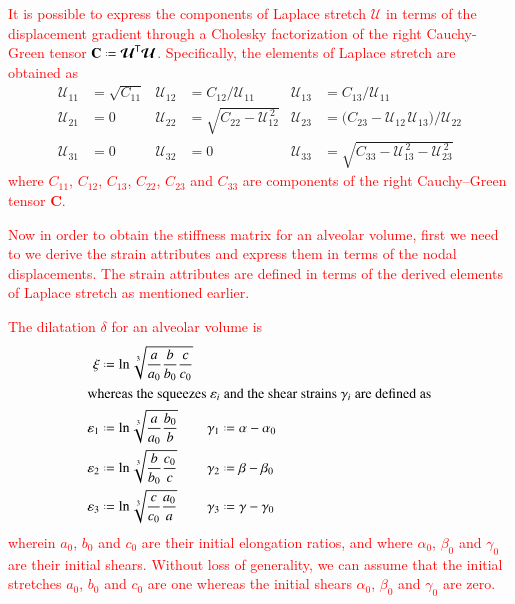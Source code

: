 \textcolor{red}{It is possible to express the components of Laplace stretch $\boldsymbol{\mathcal{U}}$ in terms of the displacement gradient through a Cholesky factorization of the right Cauchy-Green tensor $\mathbf{C} \defeq \boldsymbol{\mathcal{U}}^{\mathsf{T}} \boldsymbol{\mathcal{U}}$. Specifically, the elements of Laplace stretch are obtained as} 
\begin{equation}
\begin{aligned}
\mathcal{U}_{11} & = \sqrt{C_{11}} & 
\mathcal{U}_{12} & = C_{12} / \mathcal{U}_{11} &
\mathcal{U}_{13} & = C_{13} / \mathcal{U}_{11} \\
\mathcal{U}_{21} & = 0 &
\mathcal{U}_{22} & = \sqrt{C_{22} - \mathcal{U}_{12}^{\,2}} &
\mathcal{U}_{23} & = \bigl( C_{23} - \mathcal{U}_{12\,}\mathcal{U}_{13} \bigr) / \mathcal{U}_{22} \\
\mathcal{U}_{31} & = 0 &
\mathcal{U}_{32} & = 0 & 
\mathcal{U}_{33} & = \sqrt{C_{33} - \mathcal{U}_{13}^{\,2} - \mathcal{U}_{23}^{\,2}}
\end{aligned}
\label{LagrangianLaplaceStretch}
\end{equation}
\textcolor{red}{where ${C_{11}}$, ${C_{12}}$, ${C_{13}}$, $C_{22}$, $C_{23}$ and ${C_{33}}$ are components of the right Cauchy--Green tensor $\mathbf{C}$.}

\textcolor{red}{Now in order to obtain the stiffness matrix for an alveolar volume, first we need to we derive the strain attributes and express them in terms of the nodal displacements. The strain attributes are defined in terms of the derived elements of Laplace stretch as mentioned earlier.}

\textcolor{red}{The dilatation $\delta$ for an alveolar volume is} 
\begin{subequations}
	\begin{align}
	\mathrm  \xi & \defeq \ln \sqrt[3]{\frac{a}{a_0}
		\frac{b}{b_0} \frac{c}{c_0}} \\
	\intertext{whereas the squeezes $\varepsilon_i$ and the shear strains $\gamma_i$ are defined as}
	\varepsilon_1 & \defeq \ln \sqrt[3]{\frac{a}
		{a_0} \frac{b_0}{b}} & 	\gamma_1 & \defeq \alpha - \alpha_0 \\
	\varepsilon_2 & \defeq \ln \sqrt[3]{\frac{b}
		{b_0} \frac{c_0}{c}} & \gamma_2 & \defeq \beta - \beta_0 \\
	\varepsilon_3 & \defeq \ln \sqrt[3]{\frac{c}
		{c_0} \frac{a_0}{a}} & 	\gamma_3 & \defeq \gamma - \gamma_0 
	\end{align}
\end{subequations}
\textcolor{red}{wherein $a_0$, $b_0$ and $c_0$ are their initial elongation ratios, and where $\alpha_0$, $\beta_0$ and $\gamma_0$ are their initial shears. Without loss of generality, we can assume that the initial stretches $a_0$, $b_0$ and $c_0$ are one whereas the initial shears $\alpha_0$, $\beta_0$ and $\gamma_0$ are zero.}


